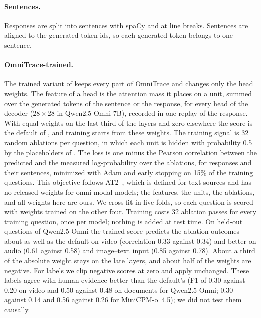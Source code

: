 \paragraph{Sentences.}
Responses are split into sentences with spaCy and at line breaks. Sentences are aligned to the generated token ids, so each generated token belongs to one sentence.

\paragraph{OmniTrace-trained.}
\label{appendix:trained}
The trained variant of  keeps every part of OmniTrace and changes only the head weights. The feature of a head is the attention mass it places on a unit, summed over the generated tokens of the sentence or the response, for every head of the decoder ($28\times28$ in Qwen2.5-Omni-7B), recorded in one replay of the response. With equal weights on the last third of the layers and zero elsewhere the score is the default of , and training starts from these weights.
The training signal is 32 random ablations per question, in which each unit is hidden with probability 0.5 by the placeholders of . The loss is one minus the Pearson correlation between the predicted and the measured log-probability over the ablations, for responses and their sentences, minimized with Adam and early stopping on 15\% of the training questions. This objective follows AT2~\cite{cohenwang2025at2}, which is defined for text sources and has no released weights for omni-modal models; the features, the units, the ablations, and all weights here are ours.
We cross-fit in five folds, so each question is scored with weights trained on the other four.
Training costs 32 ablation passes for every training question, once per model; nothing is added at test time.
On held-out questions of Qwen2.5-Omni the trained score predicts the ablation outcomes about as well as the default on video (correlation 0.33 against 0.34) and better on audio (0.61 against 0.58) and image--text input (0.85 against 0.78). About a third of the absolute weight stays on the late layers, and about half of the weights are negative.
For labels we clip negative scores at zero and apply  unchanged. These labels agree with human evidence better than the default's (F1 of 0.30 against 0.20 on video and 0.50 against 0.48 on documents for Qwen2.5-Omni; 0.30 against 0.14 and 0.56 against 0.26 for MiniCPM-o~4.5); we did not test them causally.

